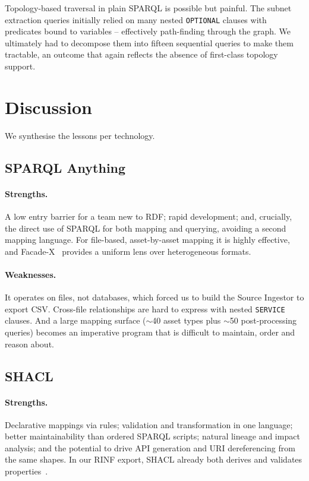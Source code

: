 \documentclass[twocolumn]{ceurart}
\begin{document}
Topology-based traversal in plain SPARQL is possible but painful. The subnet
extraction queries initially relied on many nested \texttt{OPTIONAL} clauses with
predicates bound to variables -- effectively path-finding through the graph. We
ultimately had to decompose them into fifteen sequential queries to make them
tractable, an outcome that again reflects the absence of first-class topology
support.

\section{Discussion}
\label{sec:discussion}

We synthesise the lessons per technology.

\subsection{SPARQL Anything}

\paragraph{Strengths.} A low entry barrier for a team new to RDF; rapid
development; and, crucially, the direct use of SPARQL for both mapping and
querying, avoiding a second mapping language. For file-based, asset-by-asset
mapping it is highly effective, and Facade-X~\cite{facadex} provides a uniform
lens over heterogeneous formats.

\paragraph{Weaknesses.} It operates on files, not databases, which forced us to
build the Source Ingestor to export CSV. Cross-file relationships are hard to
express with nested \texttt{SERVICE} clauses. And a large mapping surface
($\sim$40 asset types plus $\sim$50 post-processing queries) becomes an
imperative program that is difficult to maintain, order and reason about.

\subsection{SHACL}

\paragraph{Strengths.} Declarative mappings via rules; validation and
transformation in one language; better maintainability than ordered SPARQL
scripts; natural lineage and impact analysis; and the potential to drive API
generation and URI dereferencing from the same shapes. In our RINF export, SHACL
already both derives and validates properties~\cite{dim}.
\end{document}
